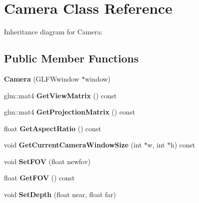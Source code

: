 \hypertarget{class_camera}{\section{Camera Class Reference}
\label{class_camera}
}


Inheritance diagram for Camera\-:
\subsection*{Public Member Functions}
\begin{DoxyCompactItemize}
\item 
\hypertarget{class_camera_a1fca12b79161a5de5c88e75e859f9ce6}{{\bfseries Camera} (G\-L\-F\-Wwindow $\ast$window)}\label{class_camera_a1fca12b79161a5de5c88e75e859f9ce6}

\item 
\hypertarget{class_camera_a739bf4fedace8b3d12868d19726df832}{glm\-::mat4 {\bfseries Get\-View\-Matrix} () const }\label{class_camera_a739bf4fedace8b3d12868d19726df832}

\item 
\hypertarget{class_camera_a497efa3119ab4ae679d29badf6f25682}{glm\-::mat4 {\bfseries Get\-Projection\-Matrix} () const }\label{class_camera_a497efa3119ab4ae679d29badf6f25682}

\item 
\hypertarget{class_camera_ae8450c209a1fb0c3353afebc1c685fe2}{float {\bfseries Get\-Aspect\-Ratio} () const }\label{class_camera_ae8450c209a1fb0c3353afebc1c685fe2}

\item 
\hypertarget{class_camera_afc9785f9dba5275a092157beb42cdac8}{void {\bfseries Get\-Current\-Camera\-Window\-Size} (int $\ast$w, int $\ast$h) const }\label{class_camera_afc9785f9dba5275a092157beb42cdac8}

\item 
\hypertarget{class_camera_a578debd1c677a7cd1ce32549599b4f2e}{void {\bfseries Set\-F\-O\-V} (float newfov)}\label{class_camera_a578debd1c677a7cd1ce32549599b4f2e}

\item 
\hypertarget{class_camera_a2cb176c282c834468b5af22a60f689ec}{float {\bfseries Get\-F\-O\-V} () const }\label{class_camera_a2cb176c282c834468b5af22a60f689ec}

\item 
\hypertarget{class_camera_af0f738f4962499bb51956e4c675047b1}{void {\bfseries Set\-Depth} (float near, float far)}\label{class_camera_af0f738f4962499bb51956e4c675047b1}


\end{DoxyCompactItemize}
